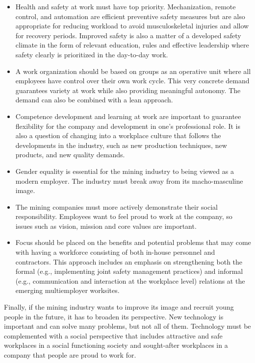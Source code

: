 \documentclass[
  12pt,
]{scrbook}
\begin{document}
\begin{itemize}
\item
  Health and safety at work must have top priority. Mechanization, remote control, and automation are efficient preventive safety measures but are also appropriate for reducing workload to avoid musculoskeletal injuries and allow for recovery periods. Improved safety is also a matter of a developed safety climate in the form of relevant education, rules and effective leadership where safety clearly is prioritized in the day-to-day work.
\item
  A work organization should be based on groups as an operative unit where all employees have control over their own work cycle. This very concrete demand guarantees variety at work while also providing meaningful autonomy. The demand can also be combined with a lean approach.
\item
  Competence development and learning at work are important to guarantee flexibility for the company and development in one's professional role. It is also a question of changing into a workplace culture that follows the developments in the industry, such as new production techniques, new products, and new quality demands.
\item
  Gender equality is essential for the mining industry to being viewed as a modern employer. The industry must break away from its macho-masculine image.
\item
  The mining companies must more actively demonstrate their social responsibility. Employees want to feel proud to work at the company, so issues such as vision, mission and core values are important.
\item
  Focus should be placed on the benefits and potential problems that may come with having a workforce consisting of both in-house personnel and contractors. This approach includes an emphasis on strengthening both the formal (e.g., implementing joint safety management practices) and informal (e.g., communication and interaction at the workplace level) relations at the emerging multiemployer worksites.
\end{itemize}

Finally, if the mining industry wants to improve its image and recruit young people in the future, it has to broaden its perspective. New technology is important and can solve many problems, but not all of them. Technology must be complemented with a social perspective that includes attractive and safe workplaces in a social functioning society and sought-after workplaces in a company that people are proud to work for.
\end{document}
